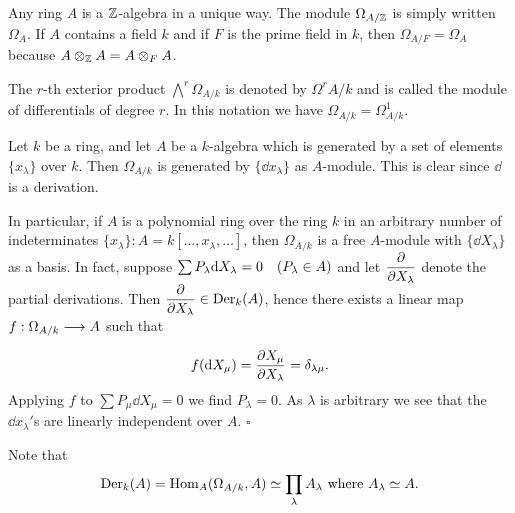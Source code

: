 \documentclass[../main]{subfiles}
\begin{document}
\newparagraph Any ring $A$ is a $\mathbb{Z}$-algebra in a unique way. The module $\Omega_{A / \mathbb{Z}}$ is simply written $\Omega_A$. If $A$ contains a field $k$ and if $F$ is the prime field in $k$, then $\Omega_{A / F}=\Omega_A$ because $A \otimes_{\mathbb{Z}} A=A \otimes_F A$.

The $r$-th exterior product $\bigwedge^r \Omega_{A / k}$ is denoted by $\Omega^r A / k$ and is called the module of differentials of degree $r$. In this notation we have $\Omega_{A / k}=\Omega^1_{A / k}$.

\begin{parexample}\label{exa:26.01}
Let $k$ be a ring, and let $A$ be a $k$-algebra which is generated by a set of elements $\{x_\lambda\}$ over $k$. Then
$\Omega_{A / k}$ is generated by $\{\dd x_\lambda\}$ as $A$-module. This is clear since $\dd$ is a derivation.
 

In particular, if $A$ is a polynomial ring over the ring $k$ in an arbitrary number of indeterminates $\{x_\lambda\}: A=k[\dots, x_\lambda, \dots]$, then $\Omega_{A / k}$ is a free $A$-module with $\{\dd X_\lambda\}$ as a basis. In fact, suppose $\sum P_\lambda \dd X_\lambda=0 \for{P_\lambda \in A}$ and let $\dfrac{\partial }{\partial X_\lambda}$ denote the partial derivations. Then $\dfrac{\partial }{\partial X_\lambda} \in \operatorname{Der}_k(A)$, hence there exists a linear map $f: \Omega_{A / k} \varrightarrow{} A$ such that \[f(\mathrm{d}X_{\mu})=\dfrac{\partial X_\mu}{\partial X_\lambda}=\delta_{\lambda \mu}. \] Applying $f$ to $\sum P_{\mu} \dd X_{\mu}=0$ we find $P_\lambda=0$. As $\lambda$ is arbitrary we see that the $\dd x_\lambda'$s are linearly independent over $A$. $\square$

Note that \[\operatorname{Der}_k(A)=\operatorname{Hom}_A(\Omega_{A/k}, A) \simeq \prod_\lambda A_\lambda\text{ where } A_\lambda \simeq A.\] 
\end{parexample}
\end{document}
